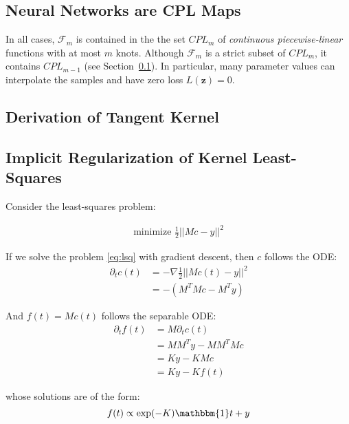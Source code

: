 \subsection{Neural Networks are CPL Maps}\label{sec:cpl}
\begin{remark}
In all cases, $\mathcal F_m$ is contained in the the set $CPL_m$ of \emph{continuous piecewise-linear} functions with at most $m$ knots. Although $\mathcal F_m$ is a strict subset of $CPL_m$, it contains $CPL_{m-1}$ (see Section~\ref{sec:cpl}). In particular, many parameter values can interpolate the samples and have zero loss $L(\bm z) = 0$.
\end{remark}

\subsection{Derivation of Tangent Kernel}

\subsection{Implicit Regularization of Kernel Least-Squares}\label{sec:implicit_regularizer}
Consider the least-squares problem:

\begin{equation}\label{eq:lsq}
\begin{gathered}
    \text{minimize } \frac{1}{2} ||Mc - y||^2
\end{gathered}
\end{equation}

If we solve the problem \eqref{eq:lsq} with gradient descent, then $c$ follows the ODE:
\begin{align}
    \partial_t c(t) &= - \nabla \frac{1}{2} ||Mc(t) - y||^2\\
                    &= -(M^T M c - M^T y)
\end{align}

And $f(t) = Mc(t)$ follows the separable ODE:
\begin{align}
    \partial_t f(t) &= M \partial_t c(t)\\
                    &= M M^T y - M M^T M c\\
                    &= K y - K Mc \\
                    &= K y - K f(t)
\end{align}

whose solutions are of the form:
\begin{equation}\label{eq:f_dynamics}
    f(t) \propto \exp(-K) \mathbbm{1} t + y
\end{equation}

